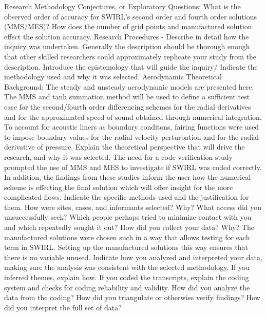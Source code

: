 \documentclass[a4paper]{report}
\begin{document}
\begin{outline}[enumerate]
    \1 Research Methodology
    \2 Conjectures, or Exploratory Questions:
    \2[-] What is the observed order of accuracy for SWIRL's second order and 
    fourth order solutions (MMS/MES)? How does the number of grid points 
    and manufactured solution effect the solution accuracy.  
    \2 Research Procedures - Describe in detail how the inquiry was undertaken.
    Generally the description should be thorough enough that other skilled
    researchers could approximately replicate your study from the description.
    \3 Introduce the epistemology that will guide the inquiry/
    Indicate the methodology used and why it was selected.
    \4 Aerodynamic Theoretical Background:
    The steady and unsteady aerodynamic models are presented here.
    \4 The MMS and tanh summation method will be used to define a sufficient test 
    case for the second/fourth order differencing schemes for the radial derivatives
    and for the approximated speed of sound obtained through numerical integration. To account 
    for acoustic liners as boundary conditons, fairing functions were used
    to impose boundary values for the radial velocity perturbation and for the 
    radial derivative of pressure.
    \3 Explain the theoretical perspective that will drive the research, and why it was selected. 
    \4 The need for a code verification study prompted the use of MMS and MES to
    investigate if SWIRL was coded correctly. In addition, the findings from these 
    studies inform the user how the numerical scheme is effecting the final solution which
    will offer insight for the more complicated flows.
    \3 Indicate the specific methods used and the justification for them. How were sites, cases, and
    informants selected? Why? What access did you unsuccessfully seek? Which people perhaps tried to
    minimize contact with you and which repeatedly sought it out? How did you collect your data? Why?
    The manufactured solutions were chosen such in a way that allows testing 
    for each term in SWIRL. Setting up the manufactured solutions this way 
    ensures that there is no variable unused.   
    \3 Indicate how you analyzed and interpreted your data, making sure the analysis was consistent with
    the selected methodology. If you inferred themes, explain how. If you coded the transcripts, explain
    the coding system and checks for coding reliability and validity. How did you analyze the data from
    the coding? How did you triangulate or otherwise verify findings? How did you interpret the full set
    of data?


\end{outline}
\end{document}

